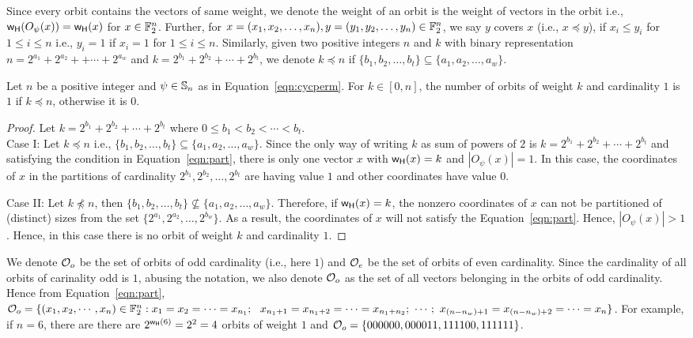 \documentclass{llncs}
\begin{document}
Since every orbit contains the vectors of same weight, we denote the weight of an orbit is the weight of vectors in the orbit i.e., $\mathsf{w_H}(O_\psi(x)) = \mathsf{w_H}(x)$ for $x \in \mathbb{F}_2^n$. Further, for $x = (x_1, x_2,\ldots, x_n), y = (y_1, y_2, \ldots, y_n) \in \mathbb{F}_2^n$, we say $y$ covers $x$ (i.e., $x \preceq y $), if $x_{i} \leq y_{i}$ for $1 \leq i \leq n$ i.e., $y_i = 1$ if $x_i = 1$ for $1 \leq i \leq n$.
Similarly, given two positive integers $n$ and $k$ with binary representation $n = 2^{a_1} + 2^{a_2} + + \cdots + 2^{a_w}$ and $k = 2^{b_1}+ 2^{b_2} + \cdots + 2^{b_t}$, we denote $k \preceq n$ if $\{b_1, b_2, \ldots, b_t\} \subseteq \{a_1, a_2, \ldots, a_w\}$.
\begin{lemma}\label{lem:orbNok}
Let $n$ be a positive integer and $\psi \in \mathbb{S}_n$ as in Equation~\ref{eqn:cycperm}. For $k \in [0,n]$, the number of orbits of weight $k$ and cardinality $1$ is $1$ if $k \preceq n$, otherwise it is $0$.
\end{lemma}
\begin{proof}
Let $k = 2^{b_1}+ 2^{b_2} + \cdots + 2^{b_t}$ where $0 \leq b_1 < b_2 < \cdots < b_t$.\\
Case I: Let $k \preceq n$ i.e., $\{b_1, b_2, \ldots, b_t\} \subseteq \{a_1, a_2, \ldots, a_w\}$. Since the only way of writing $k$ as sum of powers of $2$ is $k = 2^{b_1}+ 2^{b_2} + \cdots + 2^{b_t}$ and satisfying the condition in Equation~\ref{eqn:part}, there is only one vector $x$ with $\mathsf{w_H}(x) = k$ and $|O_\psi(x)| = 1$. In this case, the coordinates of $x$ in the partitions of cardinality $2^{b_1}, 2^{b_2}, \ldots, 2^{b_t}$ are having value $1$ and other coordinates have value $0$.

\noindent Case II: Let $k \not\preceq n$, then $\{b_1, b_2, \ldots, b_t\} \not \subseteq \{a_1, a_2, \ldots, a_w\}$. Therefore, if $\mathsf{w_H}(x) = k$, the nonzero coordinates of $x$ can not be partitioned of (distinct) sizes from the set $\{2^{a_1}, 2^{a_2}, \ldots, 2^{b_w}\}$.
As a result, the coordinates of $x$ will not satisfy the Equation~\ref{eqn:part}. Hence,
$|O_\psi(x)| > 1$. Hence, in this case there is no orbit of weight $k$ and cardinality $1$.
\end{proof}

We denote $\mathcal{O}_o$ be the set of orbits of odd cardinality (i.e., here $1$) and $\mathcal{O}_e$ be the set of orbits of even cardinality. Since the cardinality of all orbits of carinality odd is $1$, abusing the notation, we also denote $\mathcal{O}_o$ as the set of all vectors belonging in the orbits of odd cardinality. Hence from Equation~\ref{eqn:part}, 
$\mathcal{O}_o = \{(x_1, x_2, \cdots, x_n) \in \mathbb{F}_2^n : x_1 = x_2 = \cdots = x_{n_1};~~ x_{n_1 + 1} = x_{n_1 + 2} = \cdots = x_{n_1 + n_2};~ \cdots ;~ x_{(n- n_w ) + 1} = x_{(n- n_w ) + 2} = \cdots = x_n\}$.
For example, if $n = 6$, there are there are $2^{\mathsf{w_H}(6)} = 2^2 = 4$ orbits of weight $1$ and $\mathcal{O}_o = \{000000, 000011, 111100, 111111\}$. 
\end{document}
